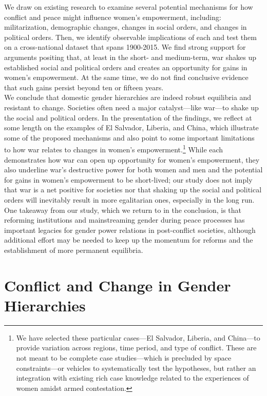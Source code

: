 \documentclass [12pt] {article}
\begin{document}
We draw on existing research to examine several potential mechanisms for how conflict and peace might influence women's empowerment, including: militarization, demographic changes, changes in social orders, and changes in political orders. Then, we identify observable implications of each and test them on a cross-national dataset that spans 1900-2015. We find strong support for arguments positing that, at least in the short- and medium-term, war shakes up established social and political orders and creates an opportunity for gains in women's empowerment. At the same time, we do not find conclusive evidence that such gains persist beyond ten or fifteen years. \\

We conclude that domestic gender hierarchies are indeed robust equilibria and resistant to change. Societies often need a major catalyst---like war---to shake up the social and political orders. In the presentation of the findings, we reflect at some length on the examples of El Salvador, Liberia, and China, which illustrate some of the proposed mechanisms and also point to some important limitations to how war relates to changes in women's empowerment.\footnote{We have selected these particular cases---El Salvador, Liberia, and China---to provide variation across regions, time period, and type of conflict. These are not meant to be complete case studies---which is precluded by space constraints---or vehicles to systematically test the hypotheses, but rather an integration with existing rich case knowledge related to the experiences of women amidst armed contestation.} While each demonstrates how war can open up opportunity for women's empowerment, they also underline war's destructive power for both women and men and the potential for gains in women's empowerment to be short-lived; our study does not imply that war is a net positive for societies nor that shaking up the social and political orders will inevitably result in more egalitarian ones, especially in the long run. One takeaway from our study, which we return to in the conclusion, is that reforming institutions and mainstreaming gender during peace processes has important legacies for gender power relations in post-conflict societies, although additional effort may be needed to keep up the momentum for reforms and the establishment of more permanent equilibria.\\


\section*{Conflict and Change in Gender Hierarchies}
\label{theory}
\vspace*{.2in}
\end{document}

